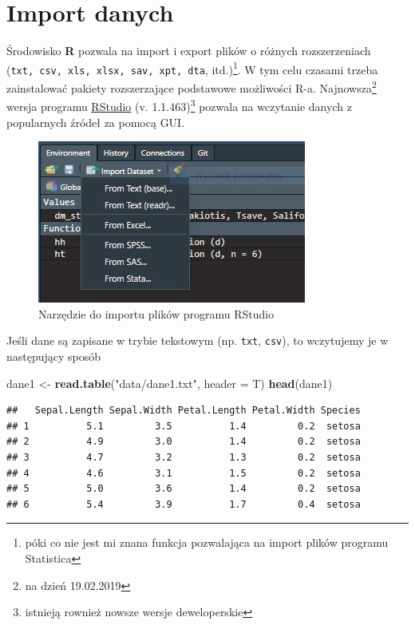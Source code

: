 \documentclass[]{book}
\newenvironment{Shaded}{\begin{snugshade}}{\end{snugshade}}
\newcommand{\DataTypeTok}[1]{\textcolor[rgb]{0.13,0.29,0.53}{#1}}
\newcommand{\KeywordTok}[1]{\textcolor[rgb]{0.13,0.29,0.53}{\textbf{#1}}}
\newcommand{\NormalTok}[1]{#1}
\newcommand{\StringTok}[1]{\textcolor[rgb]{0.31,0.60,0.02}{#1}}
\let\rmarkdownfootnote\footnote%
\def\footnote{\protect\rmarkdownfootnote}
\theoremstyle{plain}
\theoremstyle{definition}
\begin{document}
\hypertarget{roz1}{%
\chapter{Import danych}\label{roz1}}

Środowisko \textbf{R} pozwala na import i export plików o różnych rozszerzeniach (\texttt{txt,\ csv,\ xls,\ xlsx,\ sav,\ xpt,\ dta}, itd.)\footnote{póki co nie jest mi znana funkcja pozwalająca na import plików programu Statistica}. W tym celu czasami trzeba zainstalować pakiety rozszerzające podstawowe możliwości R-a. Najnowsza\footnote{na dzień 19.02.2019} wersja programu \href{https://www.rstudio.com}{RStudio} (v. 1.1.463)\footnote{istnieją rownież nowsze wersje deweloperskie} pozwala na wczytanie danych z popularnych źródeł za pomocą GUI.

\begin{figure}
\centering
\includegraphics{images/import.JPG}
\caption{\label{fig:import1}Narzędzie do importu plików programu RStudio}
\end{figure}

Jeśli dane są zapisane w trybie tekstowym (np. \texttt{txt}, \texttt{csv}), to wczytujemy je w następujący sposób

\begin{Shaded}
\begin{Highlighting}[]
\NormalTok{dane1 <-}\StringTok{ }\KeywordTok{read.table}\NormalTok{(}\StringTok{"data/dane1.txt"}\NormalTok{, }\DataTypeTok{header =}\NormalTok{ T)}
\KeywordTok{head}\NormalTok{(dane1)}
\end{Highlighting}
\end{Shaded}

\begin{verbatim}
##   Sepal.Length Sepal.Width Petal.Length Petal.Width Species
## 1          5.1         3.5          1.4         0.2  setosa
## 2          4.9         3.0          1.4         0.2  setosa
## 3          4.7         3.2          1.3         0.2  setosa
## 4          4.6         3.1          1.5         0.2  setosa
## 5          5.0         3.6          1.4         0.2  setosa
## 6          5.4         3.9          1.7         0.4  setosa
\end{verbatim}
\end{document}
